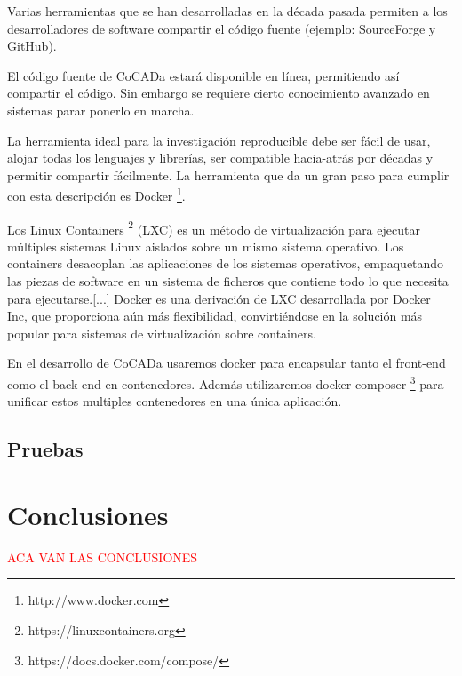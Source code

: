 \begin{displayquote}
Varias herramientas que se han desarrolladas en la década pasada permiten a los desarrolladores de software compartir el código fuente (ejemplo: SourceForge y GitHub).\citep{Chamberlain2014}\end{displayquote}

El código fuente de CoCADa estará disponible en línea, permitiendo así compartir el código. Sin embargo se requiere cierto conocimiento avanzado en sistemas parar ponerlo en marcha.

\begin{displayquote}
La herramienta ideal para la investigación reproducible debe ser fácil de usar, alojar todas los lenguajes y librerías, ser compatible hacia-atrás por décadas y permitir compartir fácilmente. La herramienta que da un gran paso para cumplir con esta descripción es Docker  \footnote{http://www.docker.com}. \citep{Chamberlain2014}
\end{displayquote}

\begin{displayquote}
Los Linux Containers \footnote{https://linuxcontainers.org} (LXC) es un método de virtualización para ejecutar múltiples sistemas Linux aislados sobre un mismo sistema operativo. Los containers desacoplan las aplicaciones de los sistemas operativos, empaquetando las piezas de software en un sistema de ficheros que contiene todo lo que necesita para ejecutarse.[...] Docker es una derivación de LXC desarrollada por Docker Inc, que proporciona aún más flexibilidad, convirtiéndose en la solución más popular para sistemas de virtualización sobre containers\citep{Alonso2017}.
\end{displayquote}

En el desarrollo de CoCADa usaremos docker para encapsular tanto el front-end como el back-end en contenedores. Además utilizaremos docker-composer  \footnote{https://docs.docker.com/compose/} para unificar estos multiples contenedores en una única aplicación.



\subsection{Pruebas}


\section{Conclusiones}

\textcolor{red}{ACA VAN LAS CONCLUSIONES}


